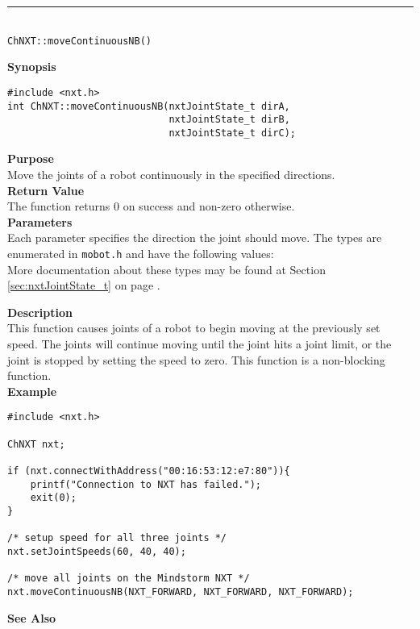 \noindent
\vspace{5pt}
\rule{4.5in}{0.015in}\\
\noindent
{\LARGE \texttt{ChNXT::moveContinuousNB()} }\\


\noindent
{\bf Synopsis}
\begin{lstlisting}
#include <nxt.h>
int ChNXT::moveContinuousNB(nxtJointState_t dirA, 
                            nxtJointState_t dirB, 
                            nxtJointState_t dirC); 
\end{lstlisting}

\noindent
{\bf Purpose}\\
Move the joints of a robot continuously in the specified directions.\\

\noindent
{\bf Return Value}\\
The function returns 0 on success and non-zero otherwise.\\

\noindent
{\bf Parameters}\\
Each parameter specifies the direction the joint should move. The types
are enumerated in \texttt{mobot.h} and have the following values:\\

\noindent
More documentation about these types may be found at Section
\ref{sec:nxtJointState_t} on page
\pageref{sec:nxtJointState_t}.

\noindent
{\bf Description}\\
This function causes joints of a robot to begin moving at the 
previously set speed. The joints will continue moving until the 
joint hits a joint limit, or the joint is stopped by setting the 
speed to zero. This function is a non-blocking function.\\

\noindent
{\bf Example}
\begin{lstlisting}
#include <nxt.h> 

ChNXT nxt;

if (nxt.connectWithAddress("00:16:53:12:e7:80")){
    printf("Connection to NXT has failed.");
    exit(0);
}
 
/* setup speed for all three joints */
nxt.setJointSpeeds(60, 40, 40);

/* move all joints on the Mindstorm NXT */
nxt.moveContinuousNB(NXT_FORWARD, NXT_FORWARD, NXT_FORWARD);
\end{lstlisting}

\noindent
{\bf See Also}\\
